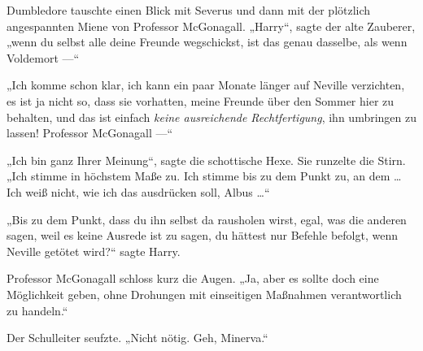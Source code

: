 Dumbledore tauschte einen Blick mit Severus und dann mit der plötzlich angespannten Miene von Professor McGonagall.
„Harry“, sagte der alte Zauberer, „wenn du selbst alle deine Freunde wegschickst, ist das genau dasselbe, als wenn Voldemort —“

„Ich komme schon klar, ich kann ein paar Monate länger auf Neville verzichten, es ist ja nicht so, dass sie vorhatten, meine Freunde über den Sommer hier zu behalten, und das ist einfach \emph{keine ausreichende Rechtfertigung}, ihn umbringen zu lassen! Professor McGonagall —“

„Ich bin ganz Ihrer Meinung“, sagte die schottische Hexe. Sie runzelte die Stirn.
„Ich stimme in höchstem Maße zu. Ich stimme bis zu dem Punkt zu, an dem … Ich weiß nicht, wie ich das ausdrücken soll, Albus …“

„Bis zu dem Punkt, dass du ihn selbst da rausholen wirst, egal, was die anderen sagen, weil es keine Ausrede ist zu sagen, du hättest nur Befehle befolgt, wenn Neville getötet wird?“ sagte Harry.

Professor McGonagall schloss kurz die Augen.
„Ja, aber es sollte doch eine Möglichkeit geben, ohne Drohungen mit einseitigen Maßnahmen verantwortlich zu handeln.“

Der Schulleiter seufzte.
„Nicht nötig. Geh, Minerva.“

